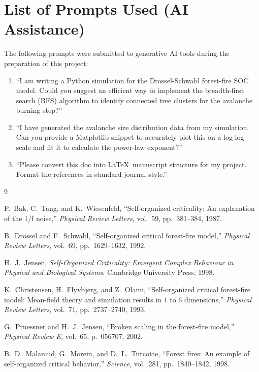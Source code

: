 \documentclass[12pt,a4paper]{article}
\begin{document}
\clearpage
\section*{List of Prompts Used (AI Assistance)}

The following prompts were submitted to generative AI tools during the
preparation of this project:

\begin{enumerate}
  \item ``I am writing a Python simulation for the Drossel-Schwabl forest-fire SOC model. Could you suggest an efficient way to implement the breadth-first search (BFS) algorithm to identify connected tree clusters for the avalanche burning step?''
  \item ``I have generated the avalanche size distribution data from my simulation. Can you provide a Matplotlib snippet to accurately plot this on a log-log scale and fit it to calculate the power-law exponent?''
  \item ``Please convert this doc into \LaTeX\ manuscript structure for my project. Format the references in standard journal style.''
 
\end{enumerate}

\clearpage
\begin{thebibliography}{9}

P.\ Bak, C.\ Tang, and K.\ Wiesenfeld,
``Self-organized criticality: An explanation of the 1/f noise,''
\textit{Physical Review Letters}, vol.\ 59, pp.\ 381--384, 1987.

B.\ Drossel and F.\ Schwabl,
``Self-organized critical forest-fire model,''
\textit{Physical Review Letters}, vol.\ 69, pp.\ 1629--1632, 1992.

H.\ J.\ Jensen,
\textit{Self-Organized Criticality: Emergent Complex Behaviour in Physical
and Biological Systems}.
Cambridge University Press, 1998.

K.\ Christensen, H.\ Flyvbjerg, and Z.\ Olami,
``Self-organized critical forest-fire model: Mean-field theory and
simulation results in $1$ to $6$ dimensions,''
\textit{Physical Review Letters}, vol.\ 71, pp.\ 2737--2740, 1993.

G.\ Pruessner and H.\ J.\ Jensen,
``Broken scaling in the forest-fire model,''
\textit{Physical Review E}, vol.\ 65, p.\ 056707, 2002.

B.\ D.\ Malamud, G.\ Morein, and D.\ L.\ Turcotte,
``Forest fires: An example of self-organized critical behavior,''
\textit{Science}, vol.\ 281, pp.\ 1840--1842, 1998.

\end{thebibliography}
\end{document}
